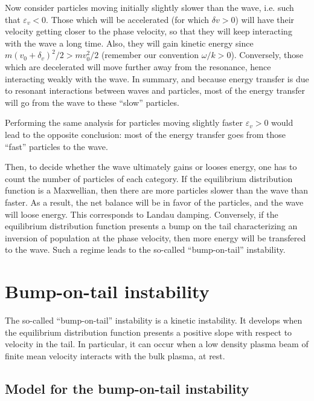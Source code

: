 \documentclass[11pt]{article}
\begin{document}
Now consider particles moving initially slightly slower than the wave, i.e. such that $\varepsilon_v<0$. Those which will be accelerated (for which $\delta v >0$) will have their velocity getting closer to the phase velocity, so that they will keep interacting with the wave a long time. Also, they will gain kinetic energy since $m(v_0+\delta_v)^2/2 > mv_0^2/2$ (remember our convention $\omega/k>0$). Conversely, those which are decelerated will move further away from the resonance, hence interacting weakly with the wave. In summary, and because energy transfer is due to resonant interactions between waves and particles, most of the energy transfer will go from the wave to these ``slow'' particles.

Performing the same analysis for particles moving slightly faster  $\varepsilon_v>0$ would lead to the opposite conclusion: most of the energy transfer goes from those ``fast'' particles to the wave.

Then, to decide whether the wave ultimately gains or looses energy, one has to count the number of particles of each category. If the equilibrium distribution function is a Maxwellian, then there are more particles slower than the wave than faster. As a result, the net balance will be in favor of the particles, and the wave will loose energy. This corresponds to Landau damping.
Conversely, if the equilibrium distribution function presents a bump on the tail characterizing an inversion of population at the phase velocity, then more energy will be transfered to the wave. Such a regime leads to the so-called ``bump-on-tail'' instability.

\section{Bump-on-tail instability} \label{sec:BoT}

The so-called ``bump-on-tail'' instability is a kinetic instability. It develops when the equilibrium distribution function presents a positive slope with respect to velocity in the tail. In particular, it can occur when a low density plasma beam of finite mean velocity interacts with the bulk plasma, at rest.

\subsection{Model for the bump-on-tail instability} 
\end{document}
